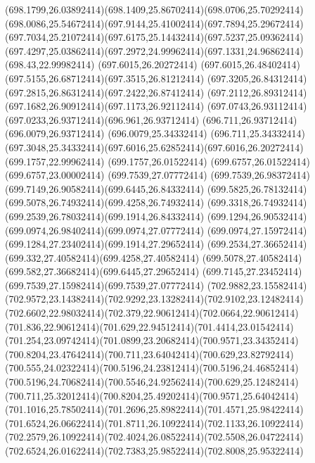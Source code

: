{{	\curveto(698.1799,26.03892414)(698.1409,25.86702414)(698.0706,25.70292414)
	\curveto(698.0086,25.54672414)(697.9144,25.41002414)(697.7894,25.29672414)
	\curveto(697.7034,25.21072414)(697.6175,25.14432414)(697.5237,25.09362414)
	\curveto(697.4297,25.03862414)(697.2972,24.99962414)(697.1331,24.96862414)
	\lineto(698.43,22.99982414)
	\closepath
	\moveto(697.6015,26.20272414)
	\curveto(697.6015,26.48402414)(697.5155,26.68712414)(697.3515,26.81212414)
	\curveto(697.3205,26.84312414)(697.2815,26.86312414)(697.2422,26.87412414)
	\curveto(697.2112,26.89312414)(697.1682,26.90912414)(697.1173,26.92112414)
	\curveto(697.0743,26.93112414)(697.0233,26.93712414)(696.961,26.93712414)
	\lineto(696.711,26.93712414)
	\lineto(696.0079,26.93712414)
	\lineto(696.0079,25.34332414)
	\lineto(696.711,25.34332414)
	\curveto(697.3048,25.34332414)(697.6016,25.62852414)(697.6016,26.20272414)
	\closepath
	\moveto(699.1757,22.99962414)
	\lineto(699.1757,26.01522414)
	\lineto(699.6757,26.01522414)
	\lineto(699.6757,23.00002414)
	\closepath
	\moveto(699.7539,27.07772414)
	\curveto(699.7539,26.98372414)(699.7149,26.90582414)(699.6445,26.84332414)
	\curveto(699.5825,26.78132414)(699.5078,26.74932414)(699.4258,26.74932414)
	\curveto(699.3318,26.74932414)(699.2539,26.78032414)(699.1914,26.84332414)
	\curveto(699.1294,26.90532414)(699.0974,26.98402414)(699.0974,27.07772414)
	\curveto(699.0974,27.15972414)(699.1284,27.23402414)(699.1914,27.29652414)
	\curveto(699.2534,27.36652414)(699.332,27.40582414)(699.4258,27.40582414)
	\curveto(699.5078,27.40582414)(699.582,27.36682414)(699.6445,27.29652414)
	\curveto(699.7145,27.23452414)(699.7539,27.15982414)(699.7539,27.07772414)
	\closepath
	\moveto(702.9882,23.15582414)
	\curveto(702.9572,23.14382414)(702.9292,23.13282414)(702.9102,23.12482414)
	\curveto(702.6602,22.98032414)(702.379,22.90612414)(702.0664,22.90612414)
	\curveto(701.836,22.90612414)(701.629,22.94512414)(701.4414,23.01542414)
	\curveto(701.254,23.09742414)(701.0899,23.20682414)(700.9571,23.34352414)
	\curveto(700.8204,23.47642414)(700.711,23.64042414)(700.629,23.82792414)
	\curveto(700.555,24.02322414)(700.5196,24.23812414)(700.5196,24.46852414)
	\curveto(700.5196,24.70682414)(700.5546,24.92562414)(700.629,25.12482414)
	\curveto(700.711,25.32012414)(700.8204,25.49202414)(700.9571,25.64042414)
	\curveto(701.1016,25.78502414)(701.2696,25.89822414)(701.4571,25.98422414)
	\curveto(701.6524,26.06622414)(701.8711,26.10922414)(702.1133,26.10922414)
	\curveto(702.2579,26.10922414)(702.4024,26.08522414)(702.5508,26.04722414)
	\curveto(702.6524,26.01622414)(702.7383,25.98522414)(702.8008,25.95322414)
}}
